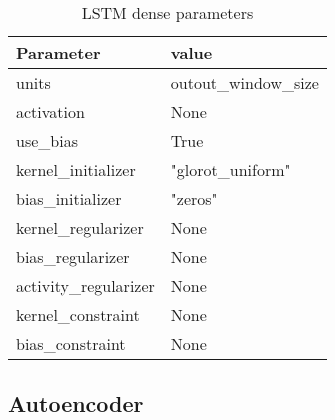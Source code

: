 \begin{table}[H]
  \centering
  \caption{LSTM dense parameters}
  \label{table:LSTM-dense-cell-parameters}
  \begin{tabular}{|l|l|}\hline
    Parameter             & value                \\ \hline
    \hline
    units                 & outout\_window\_size \\
    activation            & None                 \\
    use\_bias             & True                 \\
    kernel\_initializer   & "glorot\_uniform"    \\
    bias\_initializer     & "zeros"              \\
    kernel\_regularizer   & None                 \\
    bias\_regularizer     & None                 \\
    activity\_regularizer & None                 \\
    kernel\_constraint    & None                 \\
    bias\_constraint      & None                 \\
    \hline
  \end{tabular}
\end{table}





\subsection{Autoencoder}

